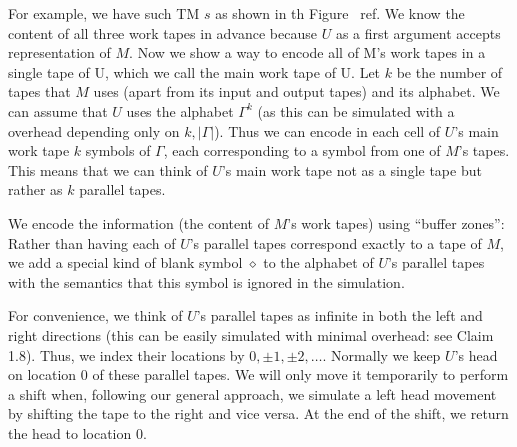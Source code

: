 \documentclass[a4paper,12pt]{article}
\begin{document}
 For example, we have such TM $s$ as shown in th Figure ~ref. We know the content of all three work tapes in advance because $U$ as a first argument accepts representation of $M$.    Now we show a way to encode all of M’s work tapes in a single tape of U, which
we call the main work tape of U. 
Let $k$ be the number of tapes that $M$ uses (apart from its input and output tapes)
and  its alphabet. We can assume that $U$ uses the
alphabet $\Gamma^{k}$ (as this can be simulated with a overhead depending only on $k, |\Gamma|$). Thus
we can encode in each cell of $U$’s main work tape $k$ symbols of $\Gamma$, each corresponding
to a symbol from one of $M$'s tapes. This means that we can think of $U$’s main work tape
not as a single tape but rather as $k$ parallel tapes. 

	We encode the information (the content of $M$'s work tapes) using “buffer zones”: Rather
than having each of $U$’s parallel tapes correspond exactly to a tape of $M$, we add a
special kind of blank symbol $\diamond$ to the alphabet of $U$’s parallel tapes with the semantics
that this symbol is ignored in the simulation.

	For convenience, we think of $U$’s parallel tapes as infinite in both the left and right
directions (this can be easily simulated with minimal overhead: see Claim 1.8). Thus, we
index their locations by $0, \pm 1, \pm 2, \dotsc $. Normally we keep $U$’s head on location 0 of these
parallel tapes. We will only move it temporarily to perform a shift when, following our
general approach, we simulate a left head movement by shifting the tape to the right
and vice versa. At the end of the shift, we return the head to location 0.
\end{document}
